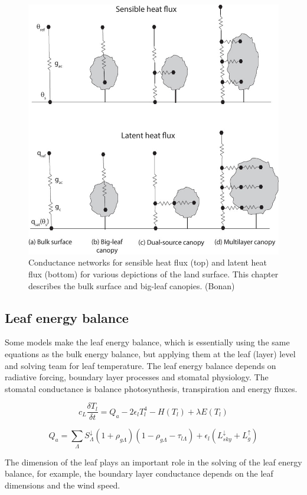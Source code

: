 \documentclass[12pt,oneside]{book}
\begin{document}
\begin{figure}

{\centering \includegraphics[width=0.8\linewidth]{figures/chap3/f330_E_balance} 

}

\caption{Conductance networks for sensible heat flux (top) and latent heat flux (bottom) for various depictions of the land surface. This chapter describes the bulk surface and big-leaf canopies. (Bonan)}\label{fig:f330}
\end{figure}

\subsection{Leaf energy balance}\label{leaf-energy-balance}

Some models make the leaf energy balance, which is essentially using the
same equations as the bulk energy balance, but applying them at the leaf
(layer) level and solving team for leaf temperature. The leaf energy
balance depends on radiative forcing, boundary layer processes and
stomatal physiology. The stomatal conductance is balance photosynthesis,
transpiration and energy fluxes.

\[
c_L \frac{\delta T_l}{\delta t} = Q_a - 2 \epsilon_l T_l^4 - H(T_l) + \lambda E(T_l)
\]

\[
Q_a = \sum_\Lambda S^{\downarrow}_\Lambda (1 + \rho_{g \Lambda})(1 - \rho_{g \Lambda} - \tau_{l \Lambda}) + \epsilon_l (L_{sky}^\downarrow+ L_g^{\uparrow})
\]

The dimension of the leaf plays an important role in the solving of the
leaf energy balance, for example, the boundary layer conductance depends
on the leaf dimensions and the wind speed.
\end{document}
